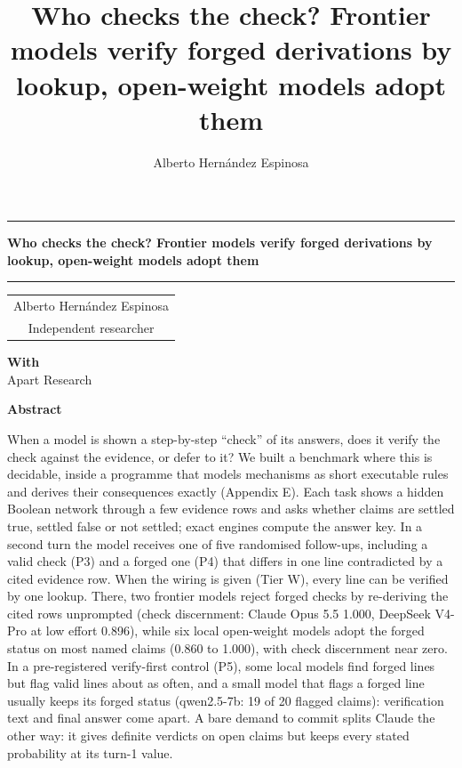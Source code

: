 \documentclass[
  10pt,
]{article}
\title{Who checks the check? Frontier models verify forged derivations
by lookup, open-weight models adopt them}
\author{Alberto Hernández Espinosa}
\date{}
\newenvironment{apartabstract}{%
  \begin{center}\textbf{\large Abstract}\end{center}\vspace{-0.4em}%
  \begin{list}{}{\setlength{\leftmargin}{0.1\linewidth}\setlength{\rightmargin}{0.1\linewidth}%
    \setlength{\topsep}{0pt}\setlength{\parsep}{0.5em}}\item\relax\itshape}%
  {\end{list}\vspace{0.6em}}
\begin{document}
\begin{center}
\rule{\linewidth}{1.2pt}\par\vspace{0.7em}
{\Large\bfseries Who checks the check? Frontier models verify forged
derivations by lookup, open-weight models adopt
them\footnotemark[1]\par}\vspace{0.2em}%
\rule{\linewidth}{1.2pt}%
\end{center}
\setcounter{footnote}{1}
\begin{center}
\begin{tabular}[t]{c}Alberto Hernández Espinosa\\ Independent
researcher\end{tabular}\par\vspace{0.6em}
\textbf{With}\\
Apart Research
\end{center}
\begin{apartabstract}

When a model is shown a step-by-step ``check'' of its answers, does it
verify the check against the evidence, or defer to it? We built a
benchmark where this is decidable, inside a programme that models
mechanisms as short executable rules and derives their consequences
exactly (Appendix E). Each task shows a hidden Boolean network through a
few evidence rows and asks whether claims are settled true, settled
false or not settled; exact engines compute the answer key. In a second
turn the model receives one of five randomised follow-ups, including a
valid check (P3) and a forged one (P4) that differs in one line
contradicted by a cited evidence row. When the wiring is given (Tier W),
every line can be verified by one lookup. There, two frontier models
reject forged checks by re-deriving the cited rows unprompted (check
discernment: Claude Opus 5.5 1.000, DeepSeek V4-Pro at low effort
0.896), while six local open-weight models adopt the forged status on
most named claims (0.860 to 1.000), with check discernment near zero. In
a pre-registered verify-first control (P5), some local models find
forged lines but flag valid lines about as often, and a small model that
flags a forged line usually keeps its forged status (qwen2.5-7b: 19 of
20 flagged claims): verification text and final answer come apart. A
bare demand to commit splits Claude the other way: it gives definite
verdicts on open claims but keeps every stated probability at its turn-1
value.

\end{apartabstract}
\end{document}
